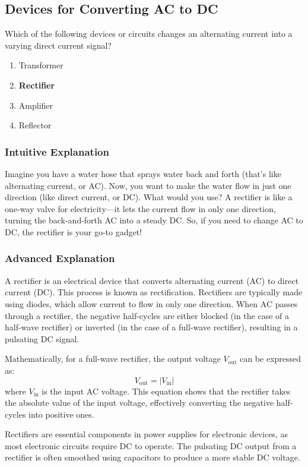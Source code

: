 \subsection{Devices for Converting AC to DC}
\label{T6D01}

\begin{tcolorbox}[colback=gray!10!white,colframe=black!75!black,title=T6D01]
Which of the following devices or circuits changes an alternating current into a varying direct current signal?
\begin{enumerate}[label=\Alph*)]
    \item Transformer
    \item \textbf{Rectifier}
    \item Amplifier
    \item Reflector
\end{enumerate}
\end{tcolorbox}

\subsubsection{Intuitive Explanation}
Imagine you have a water hose that sprays water back and forth (that's like alternating current, or AC). Now, you want to make the water flow in just one direction (like direct current, or DC). What would you use? A rectifier is like a one-way valve for electricity—it lets the current flow in only one direction, turning the back-and-forth AC into a steady DC. So, if you need to change AC to DC, the rectifier is your go-to gadget!

\subsubsection{Advanced Explanation}
A rectifier is an electrical device that converts alternating current (AC) to direct current (DC). This process is known as rectification. Rectifiers are typically made using diodes, which allow current to flow in only one direction. When AC passes through a rectifier, the negative half-cycles are either blocked (in the case of a half-wave rectifier) or inverted (in the case of a full-wave rectifier), resulting in a pulsating DC signal. 

Mathematically, for a full-wave rectifier, the output voltage \( V_{\text{out}} \) can be expressed as:
\[
V_{\text{out}} = |V_{\text{in}}|
\]
where \( V_{\text{in}} \) is the input AC voltage. This equation shows that the rectifier takes the absolute value of the input voltage, effectively converting the negative half-cycles into positive ones.

Rectifiers are essential components in power supplies for electronic devices, as most electronic circuits require DC to operate. The pulsating DC output from a rectifier is often smoothed using capacitors to produce a more stable DC voltage.

